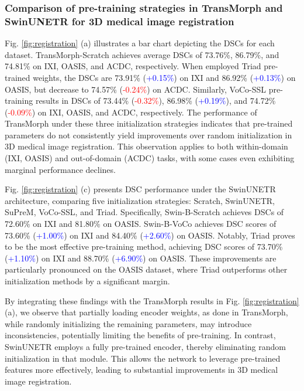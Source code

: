 \subsubsection{Comparison of pre-training strategies in TransMorph and SwinUNETR for 3D medical image registration}

Fig. \ref{fig:registration} (a) illustrates a bar chart depicting the DSCs for each dataset. TransMorph-Scratch achieves average DSCs of 73.76\%, 86.79\%, and 74.81\% on IXI, OASIS, and ACDC, respectively.
When employed Triad pre-trained weights, the DSCs are 73.91\% (\textcolor{blue}{+0.15\%}) on IXI and 86.92\% (\textcolor{blue}{+0.13\%}) on OASIS, but decrease to 74.57\% (\textcolor{red}{-0.24\%}) on ACDC.
Similarly, VoCo-SSL pre-training results in DSCs of 73.44\% (\textcolor{red}{-0.32\%}), 86.98\% (\textcolor{blue}{+0.19\%}), and 74.72\% (\textcolor{red}{-0.09\%}) on IXI, OASIS, and ACDC, respectively.
The performance of TransMorph under these three initialization strategies indicates that pre-trained parameters do not consistently yield improvements over random initialization in 3D medical image registration.
This observation applies to both within-domain (IXI, OASIS) and out-of-domain (ACDC) tasks, with some cases even exhibiting marginal performance declines.

Fig. \ref{fig:registration} (c) presents DSC performance under the SwinUNETR architecture, comparing five initialization strategies: Scratch, SwinUNETR, SuPreM, VoCo-SSL, and Triad.
Specifically, Swin-B-Scratch achieves DSCs of 72.60\% on IXI and 81.80\% on OASIS.
Swin-B-VoCo achieves DSC scores of 73.60\% (\textcolor{blue}{+1.00\%}) on IXI and 84.40\% (\textcolor{blue}{+2.60\%}) on OASIS.
Notably, Triad proves to be the most effective pre-training method, achieving DSC scores of 73.70\% (\textcolor{blue}{+1.10\%}) on IXI and 88.70\% (\textcolor{blue}{+6.90\%}) on OASIS.
These improvements are particularly pronounced on the OASIS dataset, where Triad outperforms other initialization methods by a significant margin.

By integrating these findings with the TransMorph results in Fig. \ref{fig:registration} (a), we observe that partially loading encoder weights, as done in TransMorph, while randomly initializing the remaining parameters, may introduce inconsistencies, potentially limiting the benefits of pre-training.
In contrast, SwinUNETR employs a fully pre-trained encoder, thereby eliminating random initialization in that module. This allows the network to leverage pre-trained features more effectively, leading to substantial improvements in 3D medical image registration.

